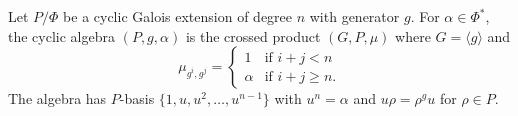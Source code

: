 Let $P/\Phi$ be a cyclic Galois extension of degree $n$ with generator $g$. For $\alpha \in \Phi^*$, the cyclic algebra $(P, g, \alpha)$ is the crossed product $(G, P, \mu)$ where $G = \langle g \rangle$ and
$$\mu_{g^i, g^j} = \begin{cases} 1 & \text{if } i+j < n \\ \alpha & \text{if } i+j \geq n. \end{cases}$$
The algebra has $P$-basis $\{1, u, u^2, \ldots, u^{n-1}\}$ with $u^n = \alpha$ and $u\rho = \rho^g u$ for $\rho \in P$.
